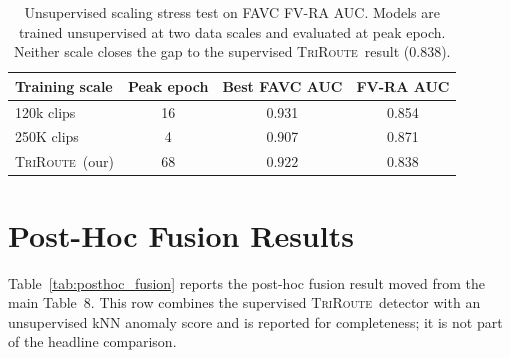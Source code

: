\documentclass{article}
\newcommand{\method}{\textsc{TriRoute}}
\begin{document}
\begin{table}[h]
    \centering
    \caption{Unsupervised scaling stress test on FAVC FV-RA AUC. Models are trained unsupervised at two data scales and evaluated at peak epoch. Neither scale closes the gap to the supervised \method\ result ($0.838$).}
    \label{tab:scaling_stress}
    \small
    \begin{tabular}{lccc}
        \toprule
        Training scale & Peak epoch & Best FAVC AUC & FV-RA AUC \\
        \midrule
        120k clips  & 16 & 0.931 & 0.854 \\
        250K clips  & 4 & 0.907 & 0.871 \\
        \midrule
        \method\ (our) & 68 & $0.922$ & $0.838$ \\
        \bottomrule
    \end{tabular}
    \vspace{0.5em}
\end{table}

\section{Post-Hoc Fusion Results}
\label{app:posthoc_fusion}

Table~\ref{tab:posthoc_fusion} reports the post-hoc fusion result moved from the main Table~8. This row combines the supervised \method\ detector with an unsupervised kNN anomaly score and is reported for completeness; it is not part of the headline comparison.

\begin{table}[h]
    \centering
    \caption{Post-hoc fusion: supervised \method\ + unsupervised kNN anomaly score, on FakeAVCeleb (FAVC) 70/30 test split and AV-Deepfake1M (AV1M) validation set. Values are percentages. Reported for completeness only; not a headline result.}
    \label{tab:posthoc_fusion}
\end{table}


\end{document}
